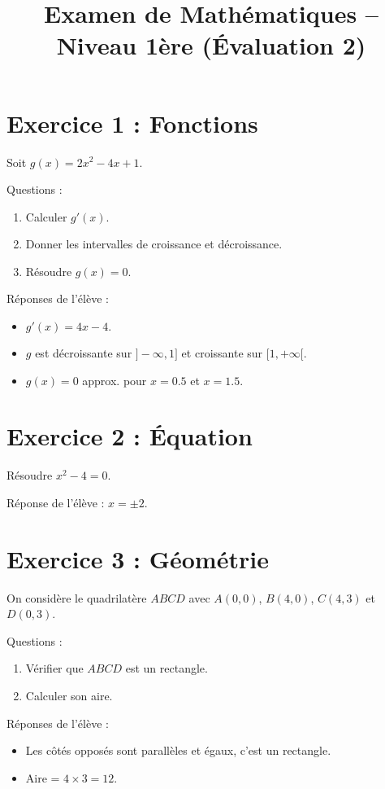 \documentclass{article}
\begin{document}
\title{Examen de Mathématiques – Niveau 1ère (Évaluation 2)}
\maketitle

\section*{Exercice 1 : Fonctions}
Soit $g(x) = 2x^2 - 4x + 1.$

Questions :
\begin{enumerate}
    \item Calculer $g'(x)$.
    \item Donner les intervalles de croissance et décroissance.
    \item Résoudre $g(x) = 0$.
\end{enumerate}

Réponses de l’élève :
\begin{itemize}
    \item $g'(x) = 4x - 4.$
    \item $g$ est décroissante sur $]-\infty, 1]$ et croissante sur $[1, +\infty[$.
    \item $g(x) = 0$ approx. pour $x = 0.5$ et $x = 1.5$.
\end{itemize}

\section*{Exercice 2 : Équation}
Résoudre $x^2 - 4 = 0.$

Réponse de l’élève :
$x = \pm 2.$

\section*{Exercice 3 : Géométrie}
On considère le quadrilatère $ABCD$ avec $A(0,0)$, $B(4,0)$, $C(4,3)$ et $D(0,3)$.

Questions :
\begin{enumerate}
    \item Vérifier que $ABCD$ est un rectangle.
    \item Calculer son aire.
\end{enumerate}

Réponses de l’élève :
\begin{itemize}
    \item Les côtés opposés sont parallèles et égaux, c’est un rectangle.
    \item Aire = $4 \times 3 = 12.$
\end{itemize}
\end{document}

